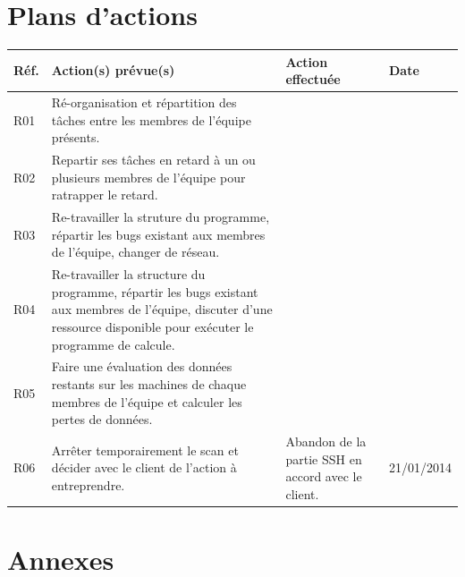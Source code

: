 \documentclass[a4paper,11pt,french]{article}
\begin{document}
\section{Plans d'actions}
\begin{center}
\begin{tabular}{|l|p{7cm}|p{7cm}|l|}
\hline
\textbf{Réf.}&\textbf{Action(s) prévue(s)}&\textbf{Action effectuée}&\textbf{Date}\\
\hline
	R01 & 
	Ré-organisation et répartition des tâches entre les membres de l'équipe présents. & & \\
\hline
	R02 &
	Repartir ses tâches en retard à un ou plusieurs membres de l'équipe pour ratrapper le retard. & & \\
\hline
	R03 &
	Re-travailler la struture du programme, répartir les bugs existant aux membres de l'équipe, changer de réseau. & & \\
\hline
R04 &
	Re-travailler la structure du programme, répartir les bugs existant aux membres de l'équipe, discuter d'une ressource disponible pour exécuter le programme de calcule.& & \\
\hline
R05 &
	Faire une évaluation des données restants sur les machines de chaque membres de l'équipe et calculer les pertes de données. & & \\
\hline
R06 & Arrêter temporairement le scan et décider avec le client de l'action à entreprendre. & Abandon de la partie SSH en accord avec le client. & 21/01/2014\\
\hline
\end{tabular}
\end{center}

\section{Annexes}
\end{document}
